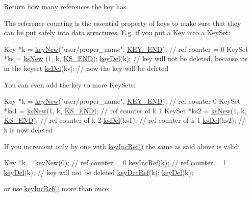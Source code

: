 Return how many references the key has. 

The reference counting is the essential property of keys to make sure that they can be put safely into data structures. E.\+g. if you put a Key into a Key\+Set\+:


\begin{DoxyCodeInclude}
Key *k = \hyperlink{group__key_gad23c65b44bf48d773759e1f9a4d43b89}{keyNew}(\textcolor{stringliteral}{"user/proper\_name"}, \hyperlink{group__key_gga91fb3178848bd682000958089abbaf40aa8adb6fcb92dec58fb19410eacfdd403}{KEY\_END}); \textcolor{comment}{// ref counter = 0}
KeySet *ks = \hyperlink{group__keyset_ga671e1aaee3ae9dc13b4834a4ddbd2c3c}{ksNew} (1, k, \hyperlink{kdbenum_8c_a7a28fce3773b2c873c94ac80b8b4cd54}{KS\_END});
\hyperlink{group__key_ga3df95bbc2494e3e6703ece5639be5bb1}{keyDel}(k); \textcolor{comment}{// key will not be deleted, because its in the keyset}
\hyperlink{group__keyset_ga27e5c16473b02a422238c8d970db7ac8}{ksDel}(ks); \textcolor{comment}{// now the key will be deleted}
\end{DoxyCodeInclude}
 You can even add the key to more Key\+Sets\+:


\begin{DoxyCodeInclude}
Key *k = \hyperlink{group__key_gad23c65b44bf48d773759e1f9a4d43b89}{keyNew}(\textcolor{stringliteral}{"user/proper\_name"}, \hyperlink{group__key_gga91fb3178848bd682000958089abbaf40aa8adb6fcb92dec58fb19410eacfdd403}{KEY\_END}); \textcolor{comment}{// ref counter 0}
KeySet *ks1 = \hyperlink{group__keyset_ga671e1aaee3ae9dc13b4834a4ddbd2c3c}{ksNew}(1, k, \hyperlink{kdbenum_8c_a7a28fce3773b2c873c94ac80b8b4cd54}{KS\_END}); \textcolor{comment}{// ref counter of k 1}
KeySet *ks2 = \hyperlink{group__keyset_ga671e1aaee3ae9dc13b4834a4ddbd2c3c}{ksNew}(1, k, \hyperlink{kdbenum_8c_a7a28fce3773b2c873c94ac80b8b4cd54}{KS\_END}); \textcolor{comment}{// ref counter of k 2}
\hyperlink{group__keyset_ga27e5c16473b02a422238c8d970db7ac8}{ksDel}(ks1); \textcolor{comment}{// ref counter of k 1}
\hyperlink{group__keyset_ga27e5c16473b02a422238c8d970db7ac8}{ksDel}(ks2); \textcolor{comment}{// k is now deleted}
\end{DoxyCodeInclude}
 If you increment only by one with \hyperlink{group__key_ga6970a6f254d67af7e39f8e469bb162f1}{key\+Inc\+Ref()} the same as said above is valid\+:


\begin{DoxyCodeInclude}
Key *k = \hyperlink{group__key_gad23c65b44bf48d773759e1f9a4d43b89}{keyNew}(0); \textcolor{comment}{// ref counter = 0}
\hyperlink{group__key_ga6970a6f254d67af7e39f8e469bb162f1}{keyIncRef}(k); \textcolor{comment}{// ref counter = 1}
\hyperlink{group__key_ga3df95bbc2494e3e6703ece5639be5bb1}{keyDel}(k); \textcolor{comment}{// key will not be deleted}
\hyperlink{group__key_ga2c6433ca22109e4e141946057eccb283}{keyDecRef}(k);
\hyperlink{group__key_ga3df95bbc2494e3e6703ece5639be5bb1}{keyDel}(k);
\end{DoxyCodeInclude}
 or use \hyperlink{group__key_ga6970a6f254d67af7e39f8e469bb162f1}{key\+Inc\+Ref()} more than once\+:


